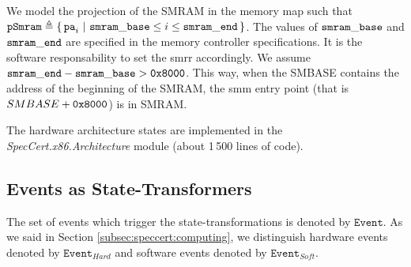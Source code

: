 We model the projection of the SMRAM in the memory map such that
$\texttt{pSmram} \triangleq \{\,\mathtt{pa}_i\ |\ \mathtt{smram\_base} \leq i \le
  \mathtt{smram\_end}\,\}$.
%
The values of $\mathtt{smram\_base}$ and $\mathtt{smram\_end}$ are specified in the
memory controller specifications.
%
It is the software responsability to set the \ac{smrr} accordingly.
%
We assume $\mathtt{smram\_end} - \mathtt{smram\_base} > \mathtt{0x8000}$.
%
This way, when the SMBASE contains the address of the beginning of the SMRAM,
the \ac{smm} entry point (that is $SMBASE + \mathtt{0x8000}$) is in SMRAM.

The hardware architecture states are implemented in the
\emph{SpecCert.x86.Archi\-tecture} module (about 1\,500 lines of code).

\subsection{Events as State-Transformers}

The set of events which trigger the state-transformations is denoted by
$\texttt{Event}$.
%
As we said in Section \ref{subsec:speccert:computing}, we distinguish hardware
events denoted by $\texttt{Event}_{Hard}$ and software events denoted by
$\texttt{Event}_{Soft}$.

